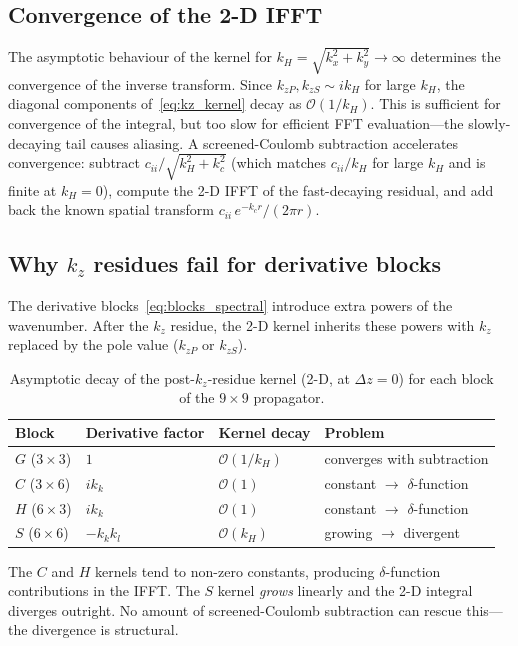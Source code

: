 \documentclass[11pt,a4paper]{article}
\newcommand{\order}[1]{\mathcal{O}\!\left(#1\right)}
\begin{document}
\subsection{Convergence of the 2-D IFFT}

The asymptotic behaviour of the kernel for
$k_H = \sqrt{k_x^2 + k_y^2} \to \infty$ determines the convergence
of the inverse transform.
Since $k_{zP}, k_{zS} \sim ik_H$ for large $k_H$, the diagonal
components of~\eqref{eq:kz_kernel} decay as $\order{1/k_H}$.
This is sufficient for convergence of the integral, but too
slow for efficient FFT evaluation---the slowly-decaying tail
causes aliasing.
A screened-Coulomb subtraction accelerates convergence:
subtract $c_{ii}/\sqrt{k_H^2 + k_c^2}$ (which matches
$c_{ii}/k_H$ for large $k_H$ and is finite at $k_H=0$),
compute the 2-D IFFT of the fast-decaying residual,
and add back the known spatial transform
$c_{ii}\,e^{-k_c r}/(2\pi r)$.

\subsection{Why \texorpdfstring{$k_z$}{kz} residues fail for derivative blocks}

The derivative blocks~\eqref{eq:blocks_spectral} introduce extra
powers of the wavenumber.
After the $k_z$ residue, the 2-D kernel inherits these powers
with $k_z$ replaced by the pole value ($k_{zP}$ or $k_{zS}$).

\begin{table}[ht]
\centering
\caption{Asymptotic decay of the post-$k_z$-residue kernel
  (2-D, at $\Delta z=0$) for each block of the $9\times 9$ propagator.}
\label{tab:kz_decay}
\begin{tabular}{@{}llll@{}}
\toprule
Block & Derivative factor & Kernel decay & Problem \\
\midrule
$G$ ($3\times 3$) & $1$ & $\order{1/k_H}$ & converges with subtraction \\
$C$ ($3\times 6$) & $ik_k$ & $\order{1}$ & constant $\to$ $\delta$-function \\
$H$ ($6\times 3$) & $ik_k$ & $\order{1}$ & constant $\to$ $\delta$-function \\
$S$ ($6\times 6$) & $-k_k k_l$ & $\order{k_H}$ & growing $\to$ divergent \\
\bottomrule
\end{tabular}
\end{table}

The $C$ and $H$ kernels tend to non-zero constants,
producing $\delta$-function contributions in the IFFT.
The $S$ kernel \emph{grows} linearly and the 2-D integral
diverges outright. No amount of screened-Coulomb subtraction
can rescue this---the divergence is structural.
\end{document}
